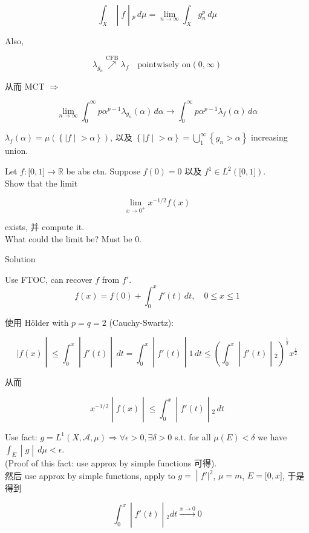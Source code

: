 \documentclass{qlnotes-export}
\begin{document}
\[\left. \int_{X} \middle| f \middle| {}_{p}\, d\mu = \lim\limits_{n\rightarrow\infty}\int_{X}g_{n}^{p}\, d\mu \right.\]

Also,

\[\lambda_{g_{n}}\operatorname{\nearrow ︎}\limits^{\text{CFB}}\lambda_{f}\quad\text{pointwisely on}(0,\infty)\]

从而 MCT \(\Longrightarrow\)

\[\lim\limits_{n\rightarrow\infty}\int_{0}^{\infty}p\alpha^{p - 1}\lambda_{g_{n}}(\alpha)\, d\alpha\rightarrow\int_{0}^{\infty}p\alpha^{p - 1}\lambda_{f}(\alpha)\, d\alpha\]

\(\lambda_{f}(\alpha) = \mu(\left\{ |f \middle| > \alpha \right\})\), 以及 \(\left\{ |f \middle| > \alpha \right\} = \bigcup_{1}^{\infty}\left\{ {g_{n} > \alpha} \right\}\) increasing union.

\begin{example}\label{ex-lec36-problem-solving-example-001}

Let \(f:\lbrack 0,1\rbrack\rightarrow{\mathbb{R}}\) be abs ctn. Suppose \(f(0) = 0\) 以及 \(f^{1} \in L^{2}(\lbrack 0,1\rbrack)\).\\
Show that the limit

\[\lim\limits_{x\rightarrow 0^{+}}x^{- 1/2}f(x)\]

exists, 并 compute it.\\
What could the limit be? Must be \(0\).\\

\end{example}

\begin{qlsolution}{Solution}

Use FTOC, can recover \(f\) from \(f'\).\\

\[f(x) = f(0) + \int_{0}^{x}f'(t)\, dt,\quad 0 \leq x \leq 1\]

使用 Hölder with \(p = q = 2\) (Cauchy-Swartz):

\[\left. |f(x) \middle| \leq \int_{0}^{x} \middle| f'(t) \middle| \, dt = \int_{0}^{x} \middle| f'(t) \middle| 1\, dt \leq (\int_{0}^{x} \middle| f'(t) \middle| {}_{2})^{\frac{1}{2}}x^{\frac{1}{2}} \right.\]

从而

\[\left. x^{- 1/2} \middle| f(x) \middle| \leq \int_{0}^{x} \middle| f'(t) \middle| {}_{2}\, dt \right.\]

Use fact: \(g = L^{1}(X,\mathcal{A},\mu)\Longrightarrow\forall\epsilon > 0,\exists\delta > 0\) s.t. for all \(\mu(E) < \delta\) we have \(\left. \int_{E} \middle| g \middle| \, d\mu < \epsilon \right.\).\\
(Proof of this fact: use approx by simple functions 可得).\\
然后 use approx by simple functions, apply to \(\left. g = \middle| f'|^{2} \right.\), \(\mu = m\), \(E = \lbrack 0,x\rbrack\), 于是得到

\[\left. \int_{0}^{x} \middle| f'(t) \middle| {}_{2}dt\overset{x\rightarrow 0}{\rightarrow}0 \right.\]

\end{qlsolution}
\end{document}
